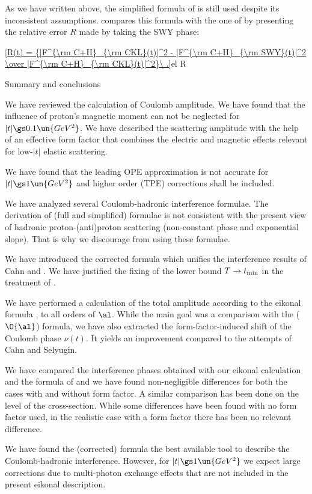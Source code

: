 
As we have written above, the simplified formula of \WaY{} is still used despite its inconsistent assumptions.  compares this formula with the one of \KaL{} by presenting the relative error $R$ made by taking the SWY phase:

\eqref{R(t) = {|F^{\rm C+H}_{\rm CKL}(t)|^2 - |F^{\rm C+H}_{\rm SWY}(t)|^2 \over |F^{\rm C+H}_{\rm CKL}(t)|^2}\ .}{el R}


\caption{Summary and conclusions}

We have reviewed the calculation of Coulomb amplitude. We have found that the influence of proton's magnetic moment can not be neglected for $|t| \gs 0.1\un{GeV^2}$. We have described the scattering amplitude with the help of an effective form factor that combines the electric and magnetic effects relevant for low-$|t|$ elastic scattering.

We have found that the leading OPE approximation is not accurate for $|t| \gs 1\un{GeV^2}$ and higher order (TPE) corrections shall be included.

We have analyzed several Coulomb-hadronic interference formulae. The derivation of (full and simplified) \WaY{} formulae is not consistent with the present view of hadronic proton-(anti)proton scattering (non-constant phase and exponential slope). That is why we discourage from using these formulae.

We have introduced the corrected \KaL{} formula which unifies the interference results of Cahn and \KaL. We have justified the fixing of the lower bound $T\to t_{\rm min}$ in the treatment of \KaL{}.

We have performed a calculation of the total amplitude according to the eikonal formula , to all orders of $\al$. While the main goal was a comparison with the ($\O{\al}$) \KaL{} formula, we have also extracted the form-factor-induced shift of the Coulomb phase $\nu(t)$. It yields an improvement compared to the attempts of Cahn and Selyugin.

We have compared the interference phases obtained with our eikonal calculation and the formula of \KaL{} and we have found non-negligible differences for both the cases with and without form factor. A similar comparison has been done on the level of the cross-section. While some differences have been found with no form factor used, in the realistic case with a form factor there has been no relevant difference.

We have found the (corrected) \KaL{} formula the best available tool to describe the Coulomb-hadronic interference. However, for $|t| \gs 1\un{GeV^2}$ we expect large corrections due to multi-photon exchange effects that are not included in the present eikonal description.
